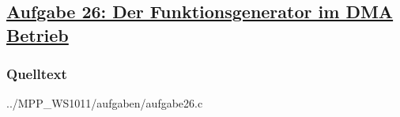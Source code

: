 \subsection
{\href{http://cst.mi.fu-berlin.de/intern/19606-P-MPP/Aufgaben/041001.html}
{Aufgabe 26: Der Funktionsgenerator im DMA Betrieb}}

\subsubsection*{Quelltext}


{../MPP_WS1011/aufgaben/aufgabe26.c}
